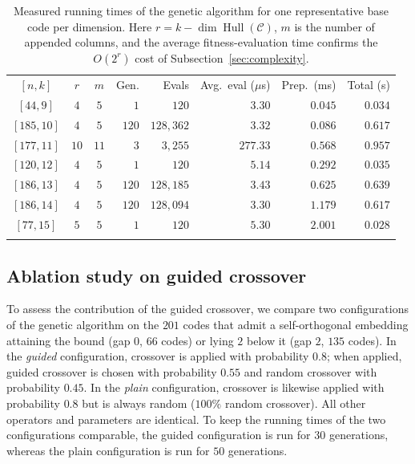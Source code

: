 \documentclass{article}
\newcommand{\Hull}{\operatorname{Hull}}
\begin{document}
\begin{table}[htbp]
\centering
\caption{Measured running times of the genetic algorithm for one representative base code per dimension. Here $r=k-\dim\Hull(\mathcal{C})$, $m$ is the number of appended columns, and the average fitness-evaluation time confirms the $O(2^{r})$ cost of Subsection~\ref{sec:complexity}.}
\label{tab:runtime}
\small
\renewcommand{\arraystretch}{1.2}
\setlength{\tabcolsep}{5pt}
\begin{tabular}{c|c|c|r|r|r|r|r}
\Xhline{2\arrayrulewidth}
$[n,k]$ & $r$ & $m$ & Gen. & Evals & Avg.\ eval ($\mu$s) & Prep.\ (ms) & Total (s) \\
\Xhline{2\arrayrulewidth}
$[44,9]$   & $4$  & $5$  & $1$   & $120$    & $3.30$   & $0.045$ & $0.034$ \\
\hline
$[185,10]$ & $4$  & $5$  & $120$ & $128{,}362$ & $3.32$   & $0.086$ & $0.617$ \\
\hline
$[177,11]$ & $10$ & $11$ & $3$   & $3{,}255$   & $277.33$ & $0.568$ & $0.957$ \\
\hline
$[120,12]$ & $4$  & $5$  & $1$   & $120$    & $5.14$   & $0.292$ & $0.035$ \\
\hline
$[186,13]$ & $4$  & $5$  & $120$ & $128{,}185$ & $3.43$   & $0.625$ & $0.639$ \\
\hline
$[186,14]$ & $4$  & $5$  & $120$ & $128{,}094$ & $3.30$   & $1.179$ & $0.617$ \\
\hline
$[77,15]$  & $5$  & $5$  & $1$   & $120$    & $5.30$   & $2.001$ & $0.028$ \\
\Xhline{2\arrayrulewidth}
\end{tabular}
\end{table}
\subsection{Ablation study on guided crossover}
\label{sec:ablation-guided}

To assess the contribution of the guided crossover, we compare two configurations of the genetic algorithm on the $201$ codes that admit a self-orthogonal embedding attaining the bound (gap $0$, $66$ codes) or lying $2$ below it (gap $2$, $135$ codes). In the \emph{guided} configuration, crossover is applied with probability $0.8$; when applied, guided crossover is chosen with probability $0.55$ and random crossover with probability $0.45$. In the \emph{plain} configuration, crossover is likewise applied with probability $0.8$ but is always random ($100\%$ random crossover). All other operators and parameters are identical. To keep the running times of the two configurations comparable, the guided configuration is run for $30$ generations, whereas the plain configuration is run for $50$ generations.
\end{document}
